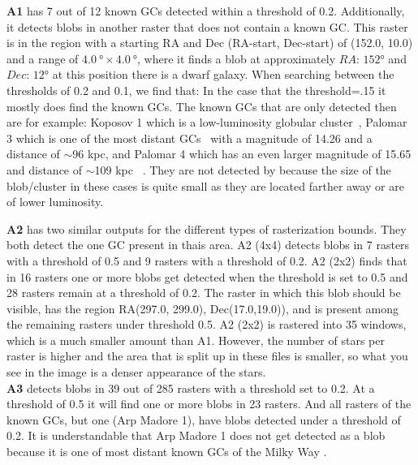 \textbf{A1} has 7 out of 12 known GCs detected within a threshold of 0.2. Additionally, it detects blobs in another raster that does not contain a known GC. This raster is in the region with a starting RA and Dec (RA-start, Dec-start) of (152.0, 10.0) and a range of $\SI{4.0}{\degree}\times\SI{4.0}{\degree}$,  where it finds a blob at approximately $RA$: $152\si{\degree}$ and $Dec$:
$12\si{\degree}$ at this position there is a dwarf galaxy.
When searching between the thresholds of 0.2 and 0.1, we find that: In the case that the threshold=.15 it mostly does find the known GCs. The known GCs that are only detected then are for example: Koposov 1 which is a low-luminosity globular cluster~\cite{Koposov2007}, Palomar 3 which is one of the most distant GCs~\cite{Sharina2018} with a magnitude of 14.26 and a distance of $\sim$96 kpc, and Palomar 4 which has an even larger magnitude of 15.65 and distance of $\sim$109 kpc~\cite{listGC} .
They are not detected by \blobdog{} because the size of the blob/cluster in these cases is quite small as they are located farther away or are of lower luminosity.

\textbf{A2} has two similar outputs for the different types of rasterization bounds. They both detect the one GC present in thais area.
A2 (4x4) detects blobs in 7 rasters with a threshold of 0.5 and 9 rasters with a threshold of 0.2.
A2 (2x2) finds that in 16 rasters one or more blobs get detected when the threshold is set to 0.5 and 28 rasters remain at a threshold of 0.2. The raster in which this blob should be visible, has the region RA(297.0, 299.0), Dec(17.0,19.0)), and is present among the remaining rasters under threshold 0.5. A2 (2x2) is rastered into 35 windows, which is a much smaller amount than A1. However, the number of stars per raster is higher and the area that is split up in these files is smaller, so what you see in the image is a denser appearance of the stars.\\

\textbf{A3} detects blobs in 39 out of 285 rasters with a threshold set to 0.2. At a threshold of 0.5 it will find one or more blobs in 23 rasters. And all rasters of the known GCs, but one (Arp Madore 1), have blobs detected under a threshold of 0.2. It is understandable that Arp Madore 1 does not get detected as a blob because it is one of most distant known GCs of the Milky Way \cite{Arp-Madore-1}.

